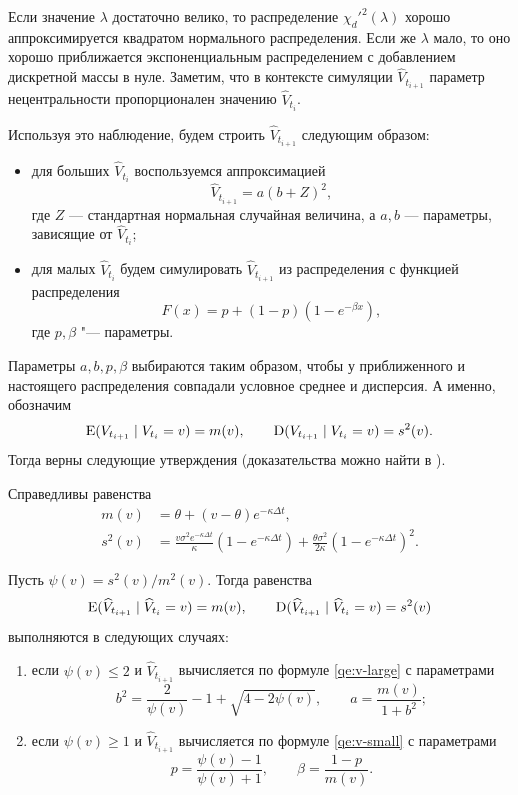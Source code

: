 Если значение $\lambda$ достаточно велико, то распределение $\chi_d'^2(\lambda)$ хорошо аппроксимируется квадратом нормального распределения.
Если же $\lambda$ мало, то оно хорошо приближается экспоненциальным распределением с добавлением дискретной массы в нуле.
Заметим, что в контексте симуляции $\hat V_{t_{i+1}}$ параметр нецентральности пропорционален значению $\hat V_{t_i}$.

Используя это наблюдение, будем строить $\hat V_{t_{i+1}}$ следующим образом:
\begin{itemize}
\item для больших $\hat V_{t_i}$ воспользуемся аппроксимацией
\begin{equation}
\label{qe:v-large}
\hat V_{t_{i+1}} = a(b+Z)^2,
\end{equation}
где $Z$ --- стандартная нормальная случайная величина, а $a,b$ --- параметры, зависящие от $\hat V_{t_i}$;

\item для малых $\hat V_{t_i}$ будем симулировать $\hat V_{t_{i+1}}$ из распределения с функцией распределения
\begin{equation}
\label{qe:v-small}
F(x) = p + (1-p)(1-e^{-\beta x}),
\end{equation}
где $p,\beta$ "--- параметры.
\end{itemize}

Параметры $a,b,p,\beta$ выбираются таким образом, чтобы у приближенного и настоящего распределения совпадали условное среднее и дисперсия.
А именно, обозначим
\[
\operatorname{E}(V_{t_{i+1}} \mid V_{t_i} = v) = m(v), \qquad 
\operatorname{D}(V_{t_{i+1}} \mid V_{t_i} = v) = s^2(v).
\]
Тогда верны следующие утверждения (доказательства можно найти в \cite{Andersen08}).

\begin{proposition}
Справедливы равенства
\begin{align*}
m(v) &= \theta + (v-\theta)e^{-\kappa \Delta t},\\
s^2(v) &= \frac{v \sigma^2 e^{-\kappa\Delta t}}{\kappa} 
  (1- e^{-\kappa\Delta t}) 
  + \frac{\theta\sigma^2}{2\kappa} (1-e^{-\kappa\Delta t})^2.
\end{align*}
\end{proposition}

\begin{proposition}
Пусть $\psi(v) = s^2(v)/m^2(v)$.
Тогда равенства
\[
\operatorname{E}(\widehat V_{t_{i+1}} \mid \widehat V_{t_i}=v) = m(v), \qquad
\operatorname{D}(\widehat V_{t_{i+1}} \mid \widehat V_{t_i}=v) = s^2(v)
\]
выполняются в следующих случаях:
\begin{enumerate}[topsep=0.5em]
\item если $\psi(v) \le 2$ и $\hat V_{t_{i+1}}$ вычисляется по формуле \eqref{qe:v-large} с параметрами
\[
b^2 = \frac{2}{\psi(v)} -1 + \sqrt{4-2\psi(v)}, \qquad a = \frac{m(v)}{1+b^2};
\]
\item если $\psi(v) \ge 1$ и $\hat V_{t_{i+1}}$ вычисляется по формуле \eqref{qe:v-small} с параметрами
\[
p = \frac{\psi(v)-1}{\psi(v)+1}, \qquad \beta = \frac{1-p}{m(v)}.
\]
\end{enumerate}
\end{proposition}

